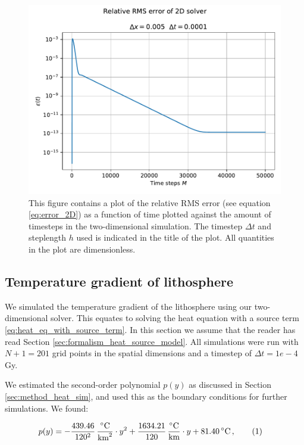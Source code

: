 \documentclass[reprint,english,notitlepage]{revtex4-1}  %
\newcommand\numberthis{\addtocounter{equation}{1}\tag{\theequation}}
\begin{document}
\begin{figure}[H]
\centering
\includegraphics[width=\columnwidth]{../data/2Derr.pdf}
\caption{This figure contains a plot of the relative RMS error (see equation \eqref{eq:error_2D}) as a function of time plotted against the amount of timesteps in the two-dimensional simulation. The timestep $\Delta t$ and steplength $h$ used is indicated in the title of the plot. All quantities in the plot are dimensionless.} \label{fig:error_2D}
\end{figure}

\subsection{Temperature gradient of lithosphere} \label{sec:results_lithosphere}

We simulated the temperature gradient of the lithosphere using our two-dimensional solver. This equates to solving the heat equation with a source term \eqref{eq:heat_eq_with_source_term}. In this section we assume that the reader has read Section \ref{sec:formalism_heat_source_model}. All simulations were run with $N+1 = 201$ grid points in the spatial dimensions and a timestep of $\Delta t = 1e-4$ Gy. 

We estimated the second-order polynomial $p(y)$ as discussed in Section \ref{sec:method_heat_sim}, and used this as the boundary conditions for further simulations. We found:

\begin{align*}
p(y) &= -\frac{439.46}{120^2} \, \frac{^\circ\text{C}}{\text{km}^2} \cdot y^2 + \frac{1634.21}{120} \, \frac{^\circ\text{C}}{\text{km}} \cdot y + 81.40 \, ^\circ\text{C} \, , \numberthis \label{eq:lithosphere_boundary_estimate}
\end{align*}
\end{document}
